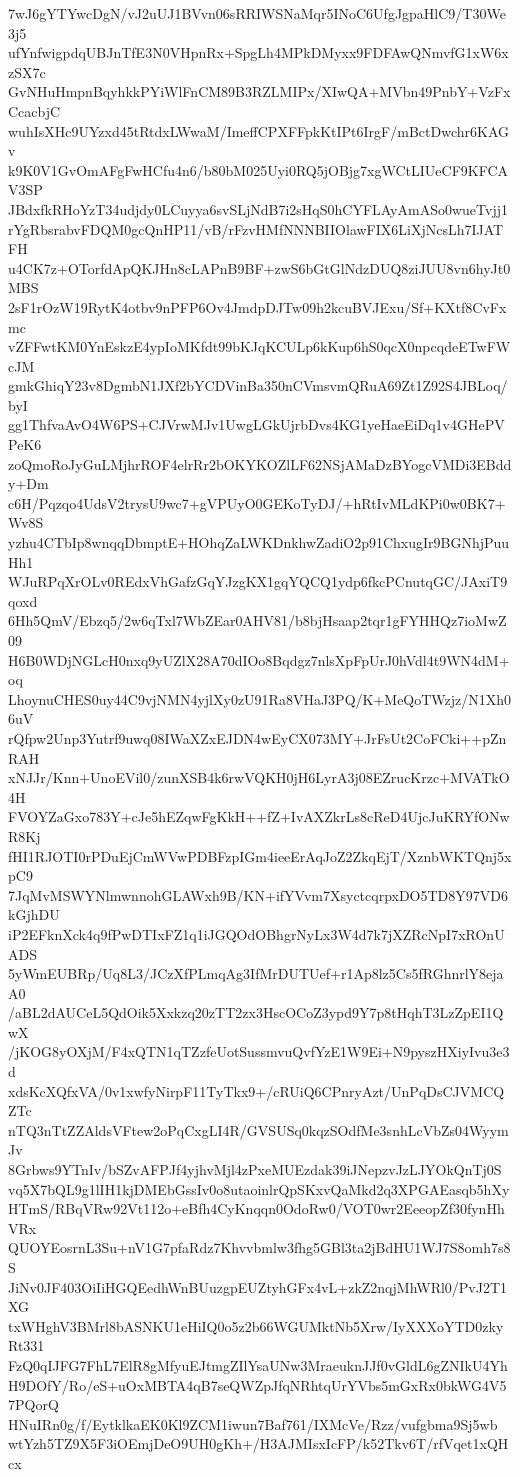 7wJ6gYTYwcDgN/vJ2uUJ1BVvn06sRRIWSNaMqr5INoC6UfgJgpaHlC9/T30We3j5
ufYnfwigpdqUBJnTfE3N0VHpnRx+SpgLh4MPkDMyxx9FDFAwQNmvfG1xW6xzSX7c
GvNHuHmpnBqyhkkPYiWlFnCM89B3RZLMIPx/XIwQA+MVbn49PnbY+VzFxCcacbjC
wuhIsXHc9UYzxd45tRtdxLWwaM/ImeffCPXFFpkKtIPt6IrgF/mBctDwchr6KAGv
k9K0V1GvOmAFgFwHCfu4n6/b80bM025Uyi0RQ5jOBjg7xgWCtLIUeCF9KFCAV3SP
JBdxfkRHoYzT34udjdy0LCuyya6svSLjNdB7i2sHqS0hCYFLAyAmASo0wueTvjj1
rYgRbsrabvFDQM0gcQnHP11/vB/rFzvHMfNNNBIIOlawFIX6LiXjNcsLh7IJATFH
u4CK7z+OTorfdApQKJHn8cLAPnB9BF+zwS6bGtGlNdzDUQ8ziJUU8vn6hyJt0MBS
2sF1rOzW19RytK4otbv9nPFP6Ov4JmdpDJTw09h2kcuBVJExu/Sf+KXtf8CvFxmc
vZFFwtKM0YnEskzE4ypIoMKfdt99bKJqKCULp6kKup6hS0qcX0npcqdeETwFWcJM
gmkGhiqY23v8DgmbN1JXf2bYCDVinBa350nCVmsvmQRuA69Zt1Z92S4JBLoq/byI
gg1ThfvaAvO4W6PS+CJVrwMJv1UwgLGkUjrbDvs4KG1yeHaeEiDq1v4GHePVPeK6
zoQmoRoJyGuLMjhrROF4elrRr2bOKYKOZlLF62NSjAMaDzBYogcVMDi3EBddy+Dm
c6H/Pqzqo4UdsV2trysU9wc7+gVPUyO0GEKoTyDJ/+hRtIvMLdKPi0w0BK7+Wv8S
yzhu4CTbIp8wnqqDbmptE+HOhqZaLWKDnkhwZadiO2p91ChxugIr9BGNhjPuuHh1
WJuRPqXrOLv0REdxVhGafzGqYJzgKX1gqYQCQ1ydp6fkcPCnutqGC/JAxiT9qoxd
6Hh5QmV/Ebzq5/2w6qTxl7WbZEar0AHV81/b8bjHsaap2tqr1gFYHHQz7ioMwZ09
H6B0WDjNGLcH0nxq9yUZlX28A70dIOo8Bqdgz7nlsXpFpUrJ0hVdl4t9WN4dM+oq
LhoynuCHES0uy44C9vjNMN4yjlXy0zU91Ra8VHaJ3PQ/K+MeQoTWzjz/N1Xh06uV
rQfpw2Unp3Yutrf9uwq08IWaXZxEJDN4wEyCX073MY+JrFsUt2CoFCki++pZnRAH
xNJJr/Knn+UnoEVil0/zunXSB4k6rwVQKH0jH6LyrA3j08EZrucKrzc+MVATkO4H
FVOYZaGxo783Y+cJe5hEZqwFgKkH++fZ+IvAXZkrLs8cReD4UjcJuKRYfONwR8Kj
fHI1RJOTI0rPDuEjCmWVwPDBFzpIGm4ieeErAqJoZ2ZkqEjT/XznbWKTQnj5xpC9
7JqMvMSWYNlmwnnohGLAWxh9B/KN+ifYVvm7XsyctcqrpxDO5TD8Y97VD6kGjhDU
iP2EFknXck4q9fPwDTIxFZ1q1iJGQOdOBhgrNyLx3W4d7k7jXZRcNpI7xROnUADS
5yWmEUBRp/Uq8L3/JCzXfPLmqAg3IfMrDUTUef+r1Ap8lz5Cs5fRGhnrlY8ejaA0
/aBL2dAUCeL5QdOik5Xxkzq20zTT2zx3HscOCoZ3ypd9Y7p8tHqhT3LzZpEI1QwX
/jKOG8yOXjM/F4xQTN1qTZzfeUotSussmvuQvfYzE1W9Ei+N9pyszHXiyIvu3e3d
xdsKcXQfxVA/0v1xwfyNirpF11TyTkx9+/cRUiQ6CPnryAzt/UnPqDsCJVMCQZTc
nTQ3nTtZZAldsVFtew2oPqCxgLI4R/GVSUSq0kqzSOdfMe3snhLcVbZs04WyymJv
8Grbws9YTnIv/bSZvAFPJf4yjhvMjl4zPxeMUEzdak39iJNepzvJzLJYOkQnTj0S
vq5X7bQL9g1lIH1kjDMEbGssIv0o8utaoinlrQpSKxvQaMkd2q3XPGAEasqb5hXy
HTmS/RBqVRw92Vt112o+eBfh4CyKnqqn0OdoRw0/VOT0wr2EeeopZf30fynHhVRx
QUOYEosrnL3Su+nV1G7pfaRdz7Khvvbmlw3fhg5GBl3ta2jBdHU1WJ7S8omh7s8S
JiNv0JF403OiIiHGQEedhWnBUuzgpEUZtyhGFx4vL+zkZ2nqjMhWRl0/PvJ2T1XG
txWHghV3BMrl8bASNKU1eHiIQ0o5z2b66WGUMktNb5Xrw/IyXXXoYTD0zkyRt331
FzQ0qIJFG7FhL7ElR8gMfyuEJtmgZIlYsaUNw3MraeuknJJf0vGldL6gZNIkU4Yh
H9DOfY/Ro/eS+uOxMBTA4qB7seQWZpJfqNRhtqUrYVbs5mGxRx0bkWG4V57PQorQ
HNuIRn0g/f/EytklkaEK0Kl9ZCM1iwun7Baf761/IXMcVe/Rzz/vufgbma9Sj5wb
wtYzh5TZ9X5F3iOEmjDeO9UH0gKh+/H3AJMIsxIcFP/k52Tkv6T/rfVqet1xQHcx
